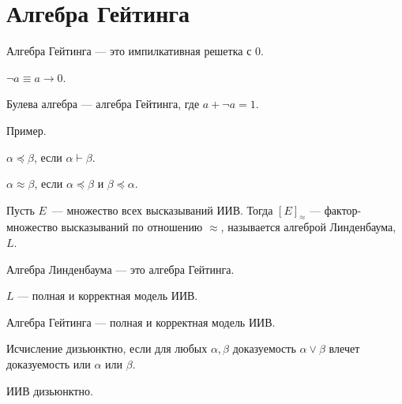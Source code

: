 \section{Алгебра Гейтинга}

\begin{definition}
    Алгебра Гейтинга --- это импилкативная решетка с 0.
\end{definition}

\begin{definition}
    $\neg a \equiv a\to 0$.
\end{definition}

\begin{definition}
    Булева алгебра --- алгебра Гейтинга, где $a + \neg a = 1$.
\end{definition}

Пример. 

\begin{definition}
    $\alpha \preccurlyeq \beta$, если $\alpha \vdash \beta$.
\end{definition}

\begin{definition}
    $\alpha \approx \beta$, если $\alpha \preccurlyeq \beta$ и $\beta \preccurlyeq \alpha$.
\end{definition}
 
\begin{definition}
    Пусть $E$~--- множество всех высказываний ИИВ.  
    Тогда $[E]_{\approx}$ --- фактор-множество высказываний по отношению $\approx$, 
    называется алгеброй Линденбаума, $L$.
\end{definition}

\begin{theorem}
    Алгебра Линденбаума --- это алгебра Гейтинга.
\end{theorem}

\begin{theorem}
    $L$ --- полная и корректная модель ИИВ.
\end{theorem}

\begin{theorem}
    Алгебра Гейтинга --- полная и корректная модель ИИВ.
\end{theorem}

\begin{definition}
    Исчисление дизьюнктно, если для любых $\alpha, \beta$ доказуемость $\alpha \lor \beta$ влечет доказуемость или $\alpha$ или $\beta$.
\end{definition}

\begin{theorem}
    ИИВ дизьюнктно.
\end{theorem}


